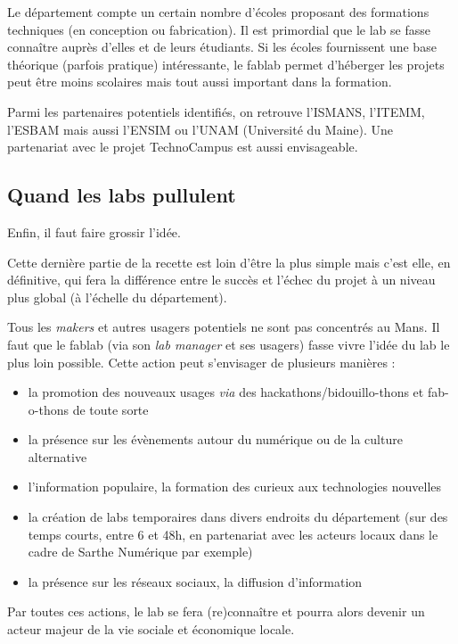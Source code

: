 Le département compte un certain nombre d'écoles proposant des formations techniques (en conception ou fabrication). Il
est primordial que le lab se fasse connaître auprès d'elles et de leurs étudiants. Si les écoles fournissent une base
théorique (parfois pratique) intéressante, le fablab permet d'héberger les projets peut être moins scolaires mais tout
aussi important dans la formation.

Parmi les partenaires potentiels identifiés, on retrouve l'ISMANS, l'ITEMM, l'ESBAM mais aussi l'ENSIM ou l'UNAM
(Université du Maine). Une partenariat avec le projet TechnoCampus est aussi envisageable.


\subsection{Quand les labs pullulent}

Enfin, il faut faire grossir l'idée.

Cette dernière partie de la recette est loin d'être la plus simple mais c'est elle, en définitive, qui fera la
différence entre le succès et l'échec du projet à un niveau plus global (à l'échelle du département).

Tous les \textit{makers} et autres usagers potentiels ne sont pas concentrés au Mans. Il faut que le fablab (via son
\textit{lab manager}
et ses usagers) fasse vivre l'idée du lab le plus loin possible. Cette action peut s'envisager de plusieurs manières :

\begin{itemize}
	\item la promotion des nouveaux usages \textit{via} des hackathons/bidouillo-thons et fab-o-thons de toute sorte
	\item la présence sur les évènements autour du numérique ou de la culture alternative
	\item l'information populaire, la formation des curieux aux technologies nouvelles
	\item la création de labs temporaires dans divers endroits du département (sur des temps courts, entre 6 et 48h, en partenariat avec les acteurs locaux dans le cadre de Sarthe Numérique par exemple)
	\item la présence sur les réseaux sociaux, la diffusion d'information
\end{itemize}

Par toutes ces actions, le lab se fera (re)connaître et pourra alors devenir un acteur majeur de la vie sociale et
économique locale.
